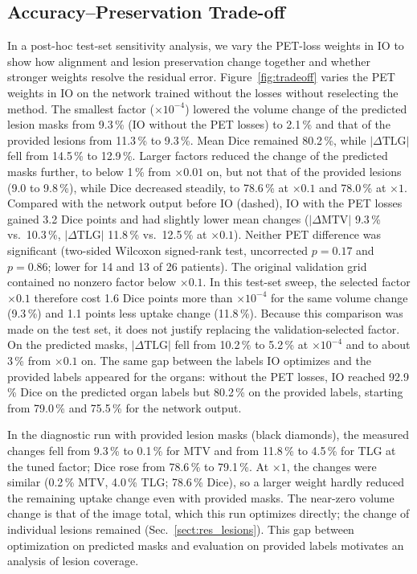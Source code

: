 \subsection{Accuracy--Preservation Trade-off}
\label{sect:res_tradeoff}
In a post-hoc test-set sensitivity analysis, we vary the PET-loss weights in IO to show how alignment and lesion preservation change together and whether stronger weights resolve the residual error.
Figure~\ref{fig:tradeoff} varies the PET weights in IO on the network trained without the losses without reselecting the method.
The smallest factor ($\times10^{-4}$) lowered the volume change of the predicted lesion masks from 9.3\,\% (IO without the PET losses) to 2.1\,\% and that of the provided lesions from 11.3\,\% to 9.3\,\%.
Mean Dice remained 80.2\,\%, while $|\Delta\mathrm{TLG}|$ fell from 14.5\,\% to 12.9\,\%.
Larger factors reduced the change of the predicted masks further, to below 1\,\% from $\times0.01$ on, but not that of the provided lesions (9.0 to 9.8\,\%), while Dice decreased steadily, to 78.6\,\% at $\times0.1$ and 78.0\,\% at $\times1$.
Compared with the network output before IO (dashed), IO with the PET losses gained 3.2 Dice points and had slightly lower mean changes ($|\Delta\mathrm{MTV}|$ 9.3\,\% vs.\ 10.3\,\%, $|\Delta\mathrm{TLG}|$ 11.8\,\% vs.\ 12.5\,\% at $\times0.1$).
Neither PET difference was significant (two-sided Wilcoxon signed-rank test, uncorrected $p=0.17$ and $p=0.86$; lower for 14 and 13 of 26 patients).
The original validation grid contained no nonzero factor below $\times0.1$.
In this test-set sweep, the selected factor $\times0.1$ therefore cost 1.6 Dice points more than $\times10^{-4}$ for the same volume change (9.3\,\%) and 1.1 points less uptake change (11.8\,\%).
Because this comparison was made on the test set, it does not justify replacing the validation-selected factor.
On the predicted masks, $|\Delta\mathrm{TLG}|$ fell from 10.2\,\% to 5.2\,\% at $\times10^{-4}$ and to about 3\,\% from $\times0.1$ on.
The same gap between the labels IO optimizes and the provided labels appeared for the organs: without the PET losses, IO reached 92.9\,\% Dice on the predicted organ labels but 80.2\,\% on the provided labels, starting from 79.0\,\% and 75.5\,\% for the network output.

In the diagnostic run with provided lesion masks (black diamonds), the measured changes fell from 9.3\,\% to 0.1\,\% for MTV and from 11.8\,\% to 4.5\,\% for TLG at the tuned factor; Dice rose from 78.6\,\% to 79.1\,\%.
At $\times1$, the changes were similar (0.2\,\% MTV, 4.0\,\% TLG; 78.6\,\% Dice), so a larger weight hardly reduced the remaining uptake change even with provided masks.
The near-zero volume change is that of the image total, which this run optimizes directly; the change of individual lesions remained (Sec.~\ref{sect:res_lesions}).
This gap between optimization on predicted masks and evaluation on provided labels motivates an analysis of lesion coverage.

